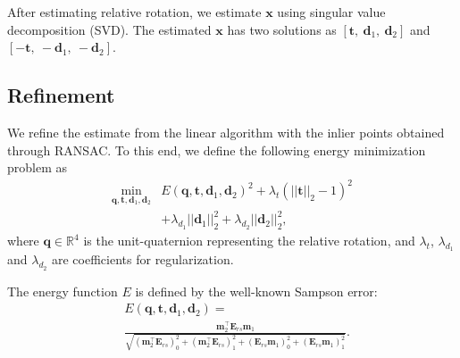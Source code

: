 \documentclass[10pt,twocolumn,letterpaper]{article}
\theoremstyle{definition}
\begin{document}
	
	After estimating relative rotation, we estimate $\mathbf{x}$ using singular value decomposition (SVD).
	The estimated $ \mathbf{x} $ has two solutions  as $ [\mathbf{t}, \ \mathbf{d}_1, \ \mathbf{d}_2]$ and $[-\mathbf{t}, \ -\mathbf{d}_1, \ -\mathbf{d}_2] $.
	
	
	\subsection{Refinement} \label{subsec:refinement}
	
	We refine the estimate from the linear algorithm with the inlier points obtained through RANSAC.
	To this end, we define the following energy minimization problem as
	\begin{equation}
	\begin{split}
	\min_{\mathbf{q},\mathbf{t},\mathbf{d}_1,\mathbf{d}_2 }&{E(\mathbf{q},\mathbf{t},\mathbf{d}_1,\mathbf{d}_2 )^2 }+ \lambda_{t}(||\mathbf{t}||_{2}-1)^2\\
	& + \lambda_{d_1}||\mathbf{d}_1||_{2}^{2} + \lambda_{d_2}||\mathbf{d}_2||_{2}^{2} ,
	\end{split}
	\end{equation}
	where $ \mathbf{q} \in \mathbb{R}^{4}$ is the unit-quaternion representing the relative rotation, and $\lambda_{t}$, $\lambda_{d_1}$ and $\lambda_{d_2}$ are coefficients for regularization.
	
	
	
	
	The energy function $E$ is defined by the well-known Sampson error:
	{
		\small
		\begin{equation}
		\begin{split}
		& E(\mathbf{q},\mathbf{t},\mathbf{d}_1,\mathbf{d}_2)  =  \\ 
		& \frac{\mathbf{m}_{2}^{\top}\mathbf{E}_{rs}\mathbf{m}_{1}} {\sqrt{(\mathbf{m}_{2}^{\top}\mathbf{E}_{rs})_{0}^2+(\mathbf{m}_{2}^{\top}\mathbf{E}_{rs})_{1}^2+(\mathbf{E}_{rs}\mathbf{m}_{1})_{0}^2+(\mathbf{E}_{rs}\mathbf{m}_{1})_{1}^2}} .
		\end{split}
		\end{equation}
	}
	
\end{document}
